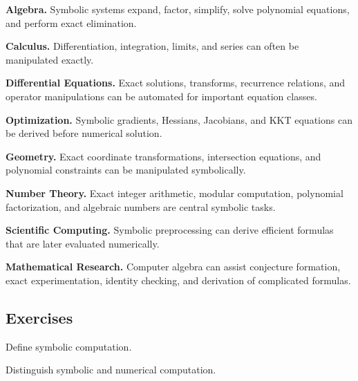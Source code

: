\begin{applicationbox}

\textbf{Algebra.}
Symbolic systems expand, factor, simplify, solve polynomial equations, and
perform exact elimination.

\medskip

\textbf{Calculus.}
Differentiation, integration, limits, and series can often be manipulated
exactly.

\medskip

\textbf{Differential Equations.}
Exact solutions, transforms, recurrence relations, and operator
manipulations can be automated for important equation classes.

\medskip

\textbf{Optimization.}
Symbolic gradients, Hessians, Jacobians, and KKT equations can be derived
before numerical solution.

\medskip

\textbf{Geometry.}
Exact coordinate transformations, intersection equations, and polynomial
constraints can be manipulated symbolically.

\medskip

\textbf{Number Theory.}
Exact integer arithmetic, modular computation, polynomial factorization,
and algebraic numbers are central symbolic tasks.

\medskip

\textbf{Scientific Computing.}
Symbolic preprocessing can derive efficient formulas that are later
evaluated numerically.

\medskip

\textbf{Mathematical Research.}
Computer algebra can assist conjecture formation, exact experimentation,
identity checking, and derivation of complicated formulas.

\end{applicationbox}

\subsection{Exercises}
\label{subsec:symbolic-computation-exercises}

\begin{exercise}[1]
Define symbolic computation.
\end{exercise}

\begin{exercise}[1]
Distinguish symbolic and numerical computation.
\end{exercise}

